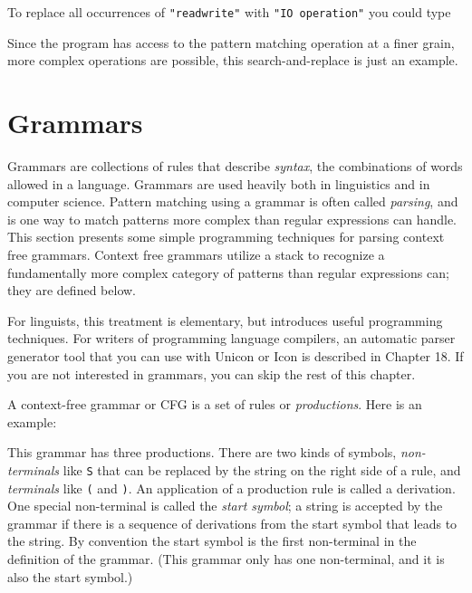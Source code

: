To replace all occurrences of
\texttt{"read{\textbar}write"} with
\texttt{"IO operation"} you could type 


Since the program has access to the pattern matching operation at a
finer grain, more complex operations are possible, this
search-and-replace is just an example.

\section{Grammars}

Grammars are collections of rules that describe
\textit{syntax}, the combinations of words allowed in a
language. Grammars are used heavily both in linguistics and in computer
science. Pattern matching using a grammar is
often called \textit{parsing}, and is one way to match
patterns more complex than regular expressions can handle. This section
presents some simple programming techniques for parsing context free
grammars. Context free grammars utilize a stack to
recognize a fundamentally more complex category of patterns than
regular expressions can; they are defined below.

For linguists, this treatment is elementary, but introduces useful
programming techniques. For writers of programming language compilers,
an automatic parser generator tool that you can use with Unicon or Icon
is described in Chapter 18. If you are not interested in grammars, you
can skip the rest of this chapter.

A context-free grammar or CFG is a set of
rules or \textit{productions}. Here is an example:


This grammar has three productions. There are two kinds of symbols,
\textit{non-terminals} like \texttt{S} that can be replaced by the
string on the right side of a rule, and \textit{terminals} like
\texttt{(} and \texttt{)}. An application of a production rule is called
a derivation. One special non-terminal is called the
\textit{start symbol}; a string is accepted by the grammar if there is a
sequence of derivations from the start symbol that leads to the string.
By convention the start symbol is the first non-terminal in the
definition of the grammar. (This grammar only has one non-terminal, and
it is also the start symbol.)


